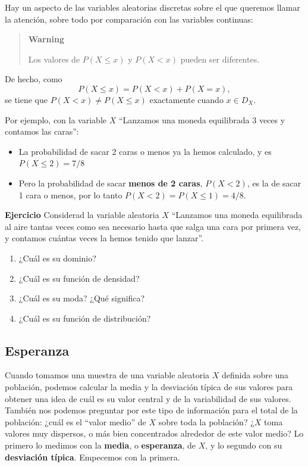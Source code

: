 \documentclass[
  spanish,
  letterpaper,
  DIV=11,
  numbers=noendperiod]{scrreprt}
\providecommand{\tightlist}{%
  \setlength{\itemsep}{0pt}\setlength{\parskip}{0pt}}
\begin{document}
\begin{tcolorbox}
Hay un aspecto de las variables aleatorias discretas sobre el que
queremos llamar la atención, sobre todo por comparación con las
variables continuas:

\begin{quote}
\textbf{Warning}

Los valores de \(P(X\leqslant x)\) y \(P(X<x)\) pueden ser diferentes.
\end{quote}

De hecho, como \[
P(X\leqslant x)=P(X<x)+P(X=x),
\] se tiene que \(P(X< x)\neq P(X\leqslant x)\) exactamente cuando
\(x\in D_X\).

Por ejemplo, con la variable \(X\) ``Lanzamos una moneda equilibrada 3
veces y contamos las caras'':

\begin{itemize}
\item
  La probabilidad de sacar 2 caras o menos ya la hemos calculado, y es
  \(P(X\leqslant 2)=7/8\)
\item
  Pero la probabilidad de sacar \textbf{menos de 2 caras}, \(P(X<2)\),
  es la de sacar 1 cara o menos, por lo tanto
  \(P(X<2)=P(X\leqslant 1)=4/8\).
\end{itemize}

\textbf{Ejercicio} Considerad la variable aleatoria \(X\) ``Lanzamos una
moneda equilibrada al aire tantas veces como sea necesario hasta que
salga una cara por primera vez, y contamos cuántas veces la hemos tenido
que lanzar''.

\begin{enumerate}
\def\labelenumi{\arabic{enumi}.}
\tightlist
\item
  ¿Cuál es su dominio?
\item
  ¿Cuál es su función de densidad?
\item
  ¿Cuál es su moda? ¿Qué significa?
\item
  ¿Cuál es su función de distribución?
\end{enumerate}

\subsection{Esperanza}\label{esperanza}

Cuando tomamos una muestra de una variable aleatoria \(X\) definida
sobre una población, podemos calcular la media y la desviación típica de
sus valores para obtener una idea de cuál es su valor central y de la
variabilidad de sus valores. También nos podemos preguntar por este tipo
de información para el total de la población: ¿cuál es el ``valor
medio'' de \(X\) sobre toda la población? ¿\(X\) toma valores muy
dispersos, o más bien concentrados alrededor de este valor medio? Lo
primero lo medimos con la \textbf{media}, o \textbf{esperanza}, de
\(X\), y lo segundo con su \textbf{desviación típica}. Empecemos con la
primera.


\end{tcolorbox}
\end{document}
